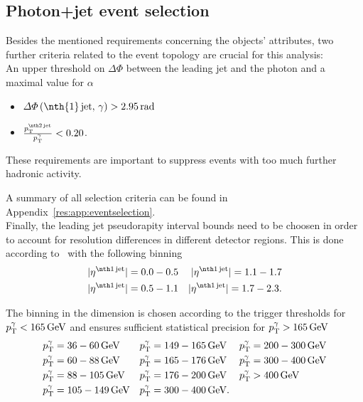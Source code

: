 \subsection{Photon+jet event selection}
Besides the mentioned requirements concerning the objects' attributes, two further criteria related to the event topology are crucial for this analysis:\\
An upper threshold on $\Delta \Phi$ between the leading jet and the photon and a maximal value for $\alpha$
\begin{itemize}
 \item $\Delta \Phi \left(\text{\nth{1}\,jet},\,\gamma \right) > 2.95\,\unit{rad}$
 \item $\frac{\ptsecondjet}{\ptgamma} < 0.20$.
\end{itemize}
These requirements are important to suppress events with too much further hadronic activity.

A summary of all selection criteria can be found in Appendix~\ref{res:app:eventselection}.\\

Finally, the leading jet pseudorapity interval bounds need to be choosen in order to account for resolution differences in different detector regions.
This is done according to~\cite{bib:Matthias_Thesis} with the following binning
\begin{align*}
|\etafirstjet| = 0.0-0.5 && |\etafirstjet| = 1.1-1.7 \\
|\etafirstjet| = 0.5-1.1 && |\etafirstjet| = 1.7-2.3.
\end{align*}

The binning in the \ptgamma dimension is chosen according to the trigger thresholds for \mbox{${p}_\mathrm{T}^{\gamma}<165\,\text{Ge}\kern-0.06667em\text{V}$} and ensures sufficient statistical precision for \mbox{${p}_\mathrm{T}^{\gamma}>165\,\text{Ge}\kern-0.06667em\text{V}$}
\begin{align*}
{p}_\mathrm{T}^{\gamma} &= 36 -60\,\text{Ge}\kern-0.06667em\text{V}     &  {p}_\mathrm{T}^{\gamma} &= 149-165\,\text{Ge}\kern-0.06667em\text{V}  & {p}_\mathrm{T}^{\gamma} &= 200-300\,\text{Ge}\kern-0.06667em\text{V}\\
{p}_\mathrm{T}^{\gamma} &= 60 -88\,\text{Ge}\kern-0.06667em\text{V}     &  {p}_\mathrm{T}^{\gamma} &= 165-176\,\text{Ge}\kern-0.06667em\text{V}  & {p}_\mathrm{T}^{\gamma} &= 300-400\,\text{Ge}\kern-0.06667em\text{V}\\
{p}_\mathrm{T}^{\gamma} &= 88 -105\,\text{Ge}\kern-0.06667em\text{V}    &  {p}_\mathrm{T}^{\gamma} &= 176-200\,\text{Ge}\kern-0.06667em\text{V}  & {p}_\mathrm{T}^{\gamma} &> 400\,\text{Ge}\kern-0.06667em\text{V}\\
{p}_\mathrm{T}^{\gamma} &= 105-149\,\text{Ge}\kern-0.06667em\text{V}    &  {p}_\mathrm{T}^{\gamma}  &= 300-400\,\text{Ge}\kern-0.06667em\text{V}. & \\
\end{align*}



